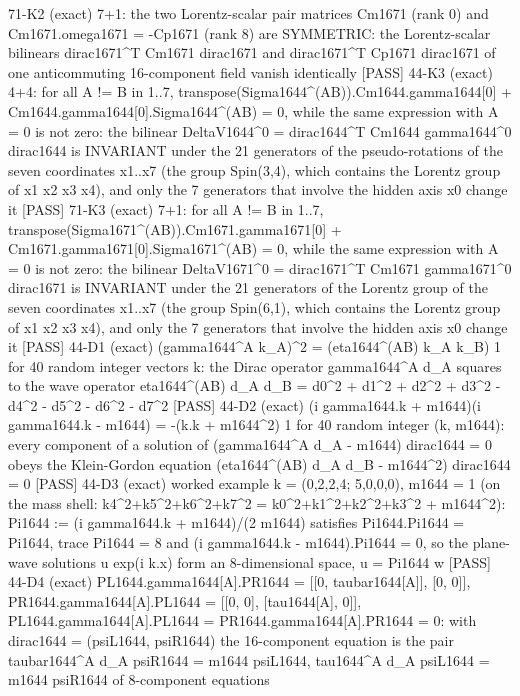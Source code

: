 \documentclass[
  10pt,
]{article}
\newenvironment{Shaded}{}{}
\newcommand{\NormalTok}[1]{#1}
\begin{document}
\begin{Shaded}
\begin{Highlighting}[]
\NormalTok{[PASS] 71{-}K2  (exact) 7+1: the two Lorentz{-}scalar pair matrices Cm1671 (rank 0) and Cm1671.omega1671 = {-}Cp1671 (rank 8) are SYMMETRIC: the Lorentz{-}scalar bilinears dirac1671\^{}T Cm1671 dirac1671 and dirac1671\^{}T Cp1671 dirac1671 of one anticommuting 16{-}component field vanish identically}
\NormalTok{[PASS] 44{-}K3  (exact) 4+4: for all A != B in 1..7, transpose(Sigma1644\^{}(AB)).Cm1644.gamma1644[0] + Cm1644.gamma1644[0].Sigma1644\^{}(AB) = 0, while the same expression with A = 0 is not zero: the bilinear DeltaV1644\^{}0 = dirac1644\^{}T Cm1644 gamma1644\^{}0 dirac1644 is INVARIANT under the 21 generators of the pseudo{-}rotations of the seven coordinates x1..x7 (the group Spin(3,4), which contains the Lorentz group of x1 x2 x3 x4), and only the 7 generators that involve the hidden axis x0 change it}
\NormalTok{[PASS] 71{-}K3  (exact) 7+1: for all A != B in 1..7, transpose(Sigma1671\^{}(AB)).Cm1671.gamma1671[0] + Cm1671.gamma1671[0].Sigma1671\^{}(AB) = 0, while the same expression with A = 0 is not zero: the bilinear DeltaV1671\^{}0 = dirac1671\^{}T Cm1671 gamma1671\^{}0 dirac1671 is INVARIANT under the 21 generators of the Lorentz group of the seven coordinates x1..x7 (the group Spin(6,1), which contains the Lorentz group of x1 x2 x3 x4), and only the 7 generators that involve the hidden axis x0 change it}
\NormalTok{[PASS] 44{-}D1  (exact) (gamma1644\^{}A k\_A)\^{}2 = (eta1644\^{}(AB) k\_A k\_B) 1 for 40 random integer vectors k: the Dirac operator gamma1644\^{}A d\_A squares to the wave operator eta1644\^{}(AB) d\_A d\_B = d0\^{}2 + d1\^{}2 + d2\^{}2 + d3\^{}2 {-} d4\^{}2 {-} d5\^{}2 {-} d6\^{}2 {-} d7\^{}2}
\NormalTok{[PASS] 44{-}D2  (exact) (i gamma1644.k + m1644)(i gamma1644.k {-} m1644) = {-}(k.k + m1644\^{}2) 1 for 40 random integer (k, m1644): every component of a solution of (gamma1644\^{}A d\_A {-} m1644) dirac1644 = 0 obeys the Klein{-}Gordon equation (eta1644\^{}(AB) d\_A d\_B {-} m1644\^{}2) dirac1644 = 0}
\NormalTok{[PASS] 44{-}D3  (exact) worked example k = (0,2,2,4; 5,0,0,0), m1644 = 1 (on the mass shell: k4\^{}2+k5\^{}2+k6\^{}2+k7\^{}2 = k0\^{}2+k1\^{}2+k2\^{}2+k3\^{}2 + m1644\^{}2): Pi1644 := (i gamma1644.k + m1644)/(2 m1644) satisfies Pi1644.Pi1644 = Pi1644, trace Pi1644 = 8 and (i gamma1644.k {-} m1644).Pi1644 = 0, so the plane{-}wave solutions u exp(i k.x) form an 8{-}dimensional space, u = Pi1644 w}
\NormalTok{[PASS] 44{-}D4  (exact) PL1644.gamma1644[A].PR1644 = [[0, taubar1644[A]], [0, 0]], PR1644.gamma1644[A].PL1644 = [[0, 0], [tau1644[A], 0]], PL1644.gamma1644[A].PL1644 = PR1644.gamma1644[A].PR1644 = 0: with dirac1644 = (psiL1644, psiR1644) the 16{-}component equation is the pair  taubar1644\^{}A d\_A psiR1644 = m1644 psiL1644,  tau1644\^{}A d\_A psiL1644 = m1644 psiR1644  of 8{-}component equations}

\end{Highlighting}
\end{Shaded}
\end{document}
